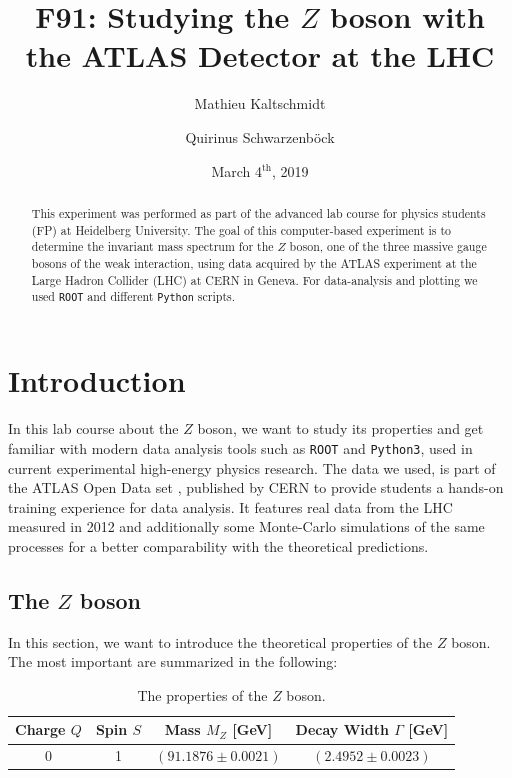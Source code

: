 \documentclass[twocolumn,
			   showpacs,%
               nofootinbib,
               aps,%
               prd,
               notitlepage,
               showkeys,
               10pt]{revtex4-1}
\begin{document}
{\hypersetup{allcolors=black}
\title{F91: Studying the $Z$ boson with the ATLAS Detector at the LHC }
\author{Mathieu Kaltschmidt}
\author{Quirinus Schwarzenb\"ock}

\date[Carried out in the week of  ]{March 4$^{\text{th}}$, 2019}


\begin{abstract}
This experiment was performed as part of the advanced lab course for physics students (FP) at Heidelberg University.
The goal of this computer-based experiment is to determine the invariant mass spectrum for the $Z$ boson, one of the three massive gauge bosons of the weak interaction, using data acquired by the ATLAS experiment at the Large Hadron Collider (LHC) at CERN in Geneva. For data-analysis  and plotting we used \verb|ROOT| and different \verb|Python| scripts.
\end{abstract}

\maketitle


}
\section{Introduction}
In this lab course about the $Z$ boson, we want to study its properties and get familiar with modern data analysis tools such as \verb|ROOT| and \verb|Python3|, used in current experimental high-energy physics research. The data we used, is part of the ATLAS Open Data set \cite{DATA}, published by CERN to provide students a hands-on training experience for data analysis. It features real data from the LHC measured in 2012 and additionally some Monte-Carlo simulations of the same processes for a better comparability with the theoretical predictions.

\subsection{The $Z$ boson}
In this section, we want to introduce the theoretical properties of the $Z$ boson. The most important are summarized in the following:

\begin{table}[!htbp]
	\centering
	\renewcommand{\arraystretch}{1.5}
	\begin{tabular}{c|c|c|c}
	Charge $Q$ & Spin $S$ & Mass $M_Z$ [GeV] & Decay Width $\Gamma$ [GeV] \\ \hline 
	 0 & 1 & $(91.1876 \pm 0.0021)$ & $(2.4952 \pm 0.0023)$ \\
		\end{tabular}
	\caption{\label{tab:Z_props}The properties of the $Z$ boson.}
\end{table}
\end{document}
